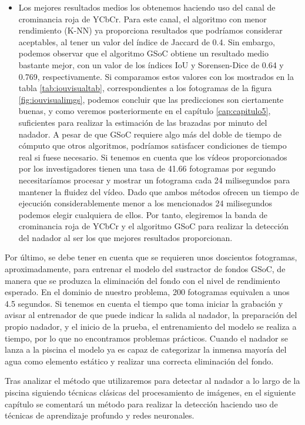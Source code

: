 \begin{itemize}
    \item Los mejores resultados medios los obtenemos haciendo uso del canal de crominancia roja de YCbCr. Para este canal, el algoritmo con menor rendimiento (K-NN) ya proporciona resultados que podríamos considerar aceptables, al tener un valor del índice de Jaccard de 0.4. Sin embargo, podemos observar que el algoritmo GSoC obtiene un resultado medio bastante mejor, con un valor de los índices IoU y Sorensen-Dice de 0.64 y 0.769, respectivamente. Si comparamos estos valores con los mostrados en la tabla \ref{tab:iouvisualtab}, correspondientes a los fotogramas de la figura \ref{fig:iouvisualimgs}, podemos concluir que las predicciones son ciertamente buenas, y como veremos posteriormente en el capítulo \ref{cap:capitulo5}, suficientes para realizar la estimación de las brazadas por minuto del nadador. A pesar de que GSoC requiere algo más del doble de tiempo de cómputo que otros algoritmos, podríamos satisfacer condiciones de tiempo real si fuese necesario. Si tenemos en cuenta que los vídeos proporcionados por los investigadores tienen una tasa de 41.66 fotogramas por segundo necesitaríamos procesar y mostrar un fotograma cada 24 milisegundos para mantener la fluidez del vídeo. Dado que ambos métodos ofrecen un tiempo de ejecución considerablemente menor a los mencionados 24 milisegundos podemos elegir cualquiera de ellos. Por tanto, elegiremos la banda de crominancia roja de YCbCr y el algoritmo GSoC para realizar la detección del nadador al ser los que mejores resultados proporcionan. 
\end{itemize}

Por último, se debe tener en cuenta que se requieren unos doscientos fotogramas, aproximadamente, para entrenar el modelo del sustractor de fondos GSoC, de manera que se produzca la eliminación del fondo con el nivel de rendimiento esperado. En el dominio de nuestro problema, 200 fotogramas equivalen a unos 4.5 segundos. Si tenemos en cuenta el tiempo que toma iniciar la grabación y avisar al entrenador de que puede indicar la salida al nadador, la preparación del propio nadador, y el inicio de la prueba, el entrenamiento del modelo se realiza a tiempo, por lo que no encontramos problemas prácticos. Cuando el nadador se lanza a la piscina el modelo ya es capaz de categorizar la inmensa mayoría del agua como elemento estático y realizar una correcta eliminación del fondo.

Tras analizar el método que utilizaremos para detectar al nadador a lo largo de la piscina siguiendo técnicas clásicas del procesamiento de imágenes, en el siguiente capítulo se comentará un método para realizar la detección haciendo uso de técnicas de aprendizaje profundo y redes neuronales.